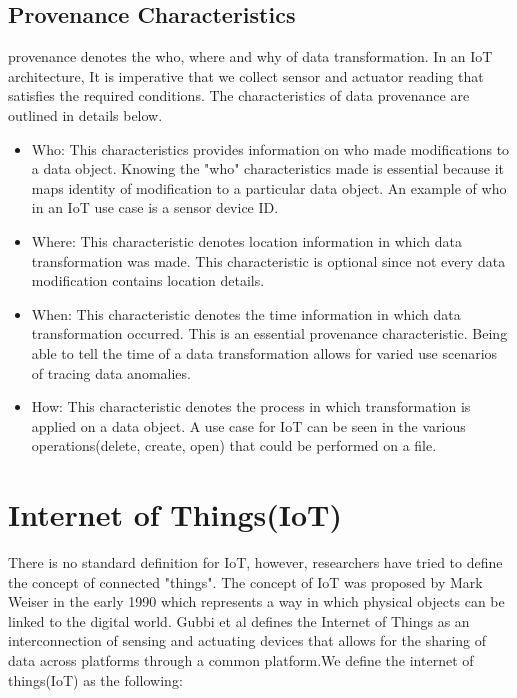 \subsection{Provenance Characteristics}

provenance denotes the who, where and why of data transformation. In an IoT architecture, It is imperative that we collect sensor and actuator reading that satisfies the required conditions. The characteristics of data provenance are outlined in details below.


\begin{itemize}

\item Who: This characteristics provides information on who made modifications to a data object. Knowing the "who" characteristics made is essential because it maps identity of modification to a particular data object. An example of who in an IoT use case is a sensor device ID.

\item Where: This characteristic denotes location information in which data transformation was made. This characteristic is optional since not every data modification contains location details.

\item When: This characteristic denotes the time information in which data transformation occurred. This is an essential provenance characteristic. Being able to tell the time of a data transformation allows for varied use scenarios of tracing data anomalies.

\item How: This characteristic denotes the process in which transformation is applied on a data object. A use case for IoT can be seen in the various operations(delete, create, open) that could be performed on a file.

\end{itemize}


 
\section{Internet of Things(IoT)}
There is no standard definition for IoT, however, researchers have tried to define the concept of connected "things". The concept of IoT was proposed by Mark Weiser in the early 1990 which represents a way in which physical objects can be linked to the digital world. Gubbi et al defines the Internet of Things as  an interconnection of sensing and actuating devices that allows  for the sharing of data across platforms through a common platform.We define the internet of things(IoT) as the following:

